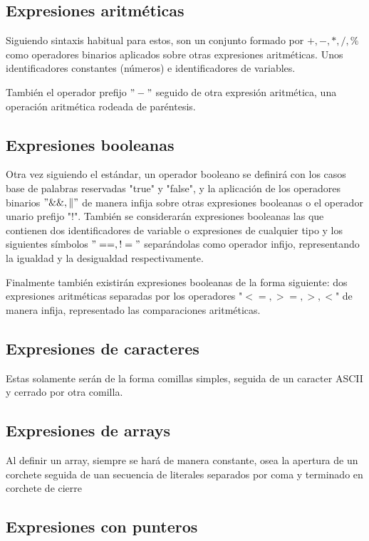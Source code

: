 \documentclass{article}
\begin{document}
\subsection{Expresiones aritméticas}

Siguiendo sintaxis habitual para estos, son un conjunto formado por $+,-,*,/, \%$ como operadores binarios aplicados sobre otras expresiones aritméticas. Unos identificadores constantes (números) e identificadores de variables.

También el operador prefijo $"-"$ seguido de otra expresión aritmética, una operación aritmética rodeada de paréntesis.

\subsection{Expresiones booleanas}
Otra vez siguiendo el estándar, un operador booleano se definirá con los casos base de palabras reservadas "true" y "false", y la aplicación de los operadores binarios $"\&\&, \|"$ de manera infija sobre otras expresiones booleanas o el operador unario prefijo "!".
También se considerarán expresiones booleanas las que contienen dos identificadores de variable o expresiones de cualquier tipo y los siguientes símbolos $"==, !="$ separándolas como operador infijo, representando la igualdad y la desigualdad respectivamente.

Finalmente también existirán expresiones booleanas de la forma siguiente: dos expresiones aritméticas separadas por los operadores "$<=, >=, >, <$" de manera infija, representado las comparaciones aritméticas.



\subsection{Expresiones de caracteres}
Estas solamente serán de la forma comillas simples, seguida de un caracter ASCII y cerrado por otra comilla.

\subsection{Expresiones de arrays}
Al definir un array, siempre se hará de manera constante, osea la apertura de un corchete seguida de uan secuencia de literales separados por coma y terminado en corchete de cierre


\subsection{Expresiones con punteros}
\end{document}
